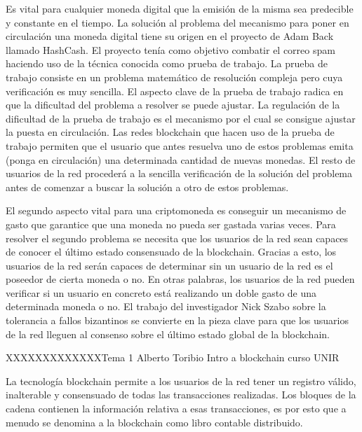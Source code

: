 Es vital para cualquier moneda digital que la emisión de la misma sea predecible y constante en el tiempo. La solución al problema del mecanismo para poner en circulación una moneda digital tiene su origen en el proyecto de Adam Back llamado HashCash. El proyecto tenía como objetivo combatir el correo spam haciendo uso de la técnica conocida como prueba de trabajo. La prueba de trabajo consiste en un problema matemático de resolución compleja pero cuya verificación es muy sencilla. El aspecto clave de la prueba de trabajo radica en que la dificultad del problema a resolver se puede ajustar. La regulación de la dificultad de la prueba de trabajo es el mecanismo por el cual se consigue ajustar la puesta en circulación. Las redes blockchain que hacen uso de la prueba de trabajo permiten que el usuario que antes resuelva uno de estos problemas emita (ponga en circulación) una determinada cantidad de nuevas monedas. El resto de usuarios de la red procederá a la sencilla verificación de la solución del problema antes de comenzar a buscar la solución a otro de estos problemas. \newline

El segundo aspecto vital para una criptomoneda es conseguir un mecanismo de gasto que garantice que una moneda no pueda ser gastada varias veces. Para resolver el segundo problema se necesita que los usuarios de la red sean capaces de conocer el último estado consensuado de la blockchain. Gracias a esto, los usuarios de la red serán capaces de determinar sin un usuario de la red es el poseedor de cierta moneda o no. En otras palabras, los usuarios de la red pueden verificar si un usuario en concreto está realizando un doble gasto de una determinada moneda o no. El trabajo del investigador Nick Szabo sobre la tolerancia a fallos bizantinos se convierte en la pieza clave para que los usuarios de la red lleguen al consenso sobre el último estado global de la blockchain. \newline

XXXXXXXXXXXXXTema 1 Alberto Toribio Intro a blockchain curso UNIR \newline

La tecnología blockchain permite a los usuarios de la red tener un registro válido, inalterable y consensuado de todas las transacciones realizadas. Los bloques de la cadena contienen la información relativa a esas transacciones, es por esto que a menudo se denomina a la blockchain como libro contable distribuido.\newline

